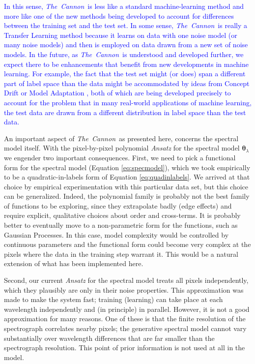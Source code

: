 \documentclass[12pt, preprint]{aastex}
\newcommand{\tc}{\textsl{The~Cannon}}
\newcommand{\set}[1]{\bm{#1}}
\begin{document}
\textcolor{blue}{In this sense, \tc\ is less like a standard machine-learning method and more like one of the new methods being developed to account for differences between the training set and the test set.  In some sense, \tc\ is really a Transfer Learning method \citep[e.g.,][]{TL} because it learns on data with one noise model (or many noise models) and then is employed on data drawn from a new set of noise models.  In the future, as \tc\ is understood and developed further, we expect there to be enhancements that benefit from new developments in machine learning.  For example, the fact that the test set might (or does) span a different part of label space than the data might be accommodated by ideas from Concept Drift \citep[e.g.,][]{CD} or Model Adaptation \citep[e.g.,][]{MA}, both of which are being developed precisely to account for the problem that in many real-world applications of machine learning, the test data are drawn from a different distribution in label space than the test data.}


An important aspect of \tc\ as presented here, concerns the spectral model itself. With the pixel-by-pixel polynomial \textit{Ansatz} for the spectral model $\set{\theta}_\lambda$
we engender two important consequences. First, we need to pick a functional form for the spectral model
(Equation \ref{eq:specmodel}), which we took empirically to be a quadratic-in-labels form of Equation \ref{eq:quadinlabels}. We arrived at that choice by empirical experimentation with this particular data set, but this choice can be generalized.
Indeed, the polynomial family is probably not the best family of
functions to be exploring, since they extrapolate badly (edge effects)
and require explicit, qualitative choices about order and cross-terms.
It is probably better to eventually move to a non-parametric form for the functions,
such as Gaussian Processes.
In this case, model complexity would be controlled by continuous
parameters and the functional form could become very complex at the pixels where the data in the
training step warrant it.
This would be a natural extension of what has been implemented here.

Second, our current \textit{Ansatz} for the spectral model treats all
pixels independently, which they plausibly are only in their noise properties.
This approximation was made to make the system fast; training
(learning) can take place at each wavelength independently and (in
principle) in parallel.
However, it is not a good approximation for many reasons.
One of these is that the finite resolution of the spectrograph
correlates nearby pixels; the generative spectral model cannot vary
substantially over wavelength differences that are far smaller than
the spectrograph resolution.
This point of prior information is not used at all in the model.
\end{document}
